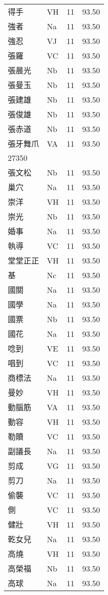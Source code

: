 \documentclass[twocolumn]{book}
\begin{document}
\begin{supertabular}{llrr}
得手 & VH & 11 &  93.50\\
強者 & Na & 11 &  93.50\\
強忍 & VJ & 11 &  93.50\\
張羅 & VC & 11 &  93.50\\
張晨光 & Nb & 11 &  93.50\\
張曼玉 & Nb & 11 &  93.50\\
張建雄 & Nb & 11 &  93.50\\
張俊雄 & Nb & 11 &  93.50\\
張赤道 & Nb & 11 &  93.50\\
張牙舞爪 & VA & 11 &  93.50\\
27350\\
張文松 & Nb & 11 &  93.50\\
巢穴 & Na & 11 &  93.50\\
崇洋 & VH & 11 &  93.50\\
崇光 & Nb & 11 &  93.50\\
婚事 & Na & 11 &  93.50\\
執導 & VC & 11 &  93.50\\
堂堂正正 & VH & 11 &  93.50\\
基 & Nc & 11 &  93.50\\
國關 & Na & 11 &  93.50\\
國學 & Na & 11 &  93.50\\
國票 & Nb & 11 &  93.50\\
國花 & Na & 11 &  93.50\\
唸到 & VE & 11 &  93.50\\
唱到 & VC & 11 &  93.50\\
商標法 & Na & 11 &  93.50\\
曼妙 & VH & 11 &  93.50\\
動腦筋 & VA & 11 &  93.50\\
動容 & VH & 11 &  93.50\\
勒贖 & VC & 11 &  93.50\\
副議長 & Na & 11 &  93.50\\
剪成 & VG & 11 &  93.50\\
剪刀 & Na & 11 &  93.50\\
偷襲 & VC & 11 &  93.50\\
側 & VC & 11 &  93.50\\
健壯 & VH & 11 &  93.50\\
乾女兒 & Na & 11 &  93.50\\
高燒 & VH & 11 &  93.50\\
高榮福 & Nb & 11 &  93.50\\
高球 & Na & 11 &  93.50\\

\end{supertabular}
\end{document}
